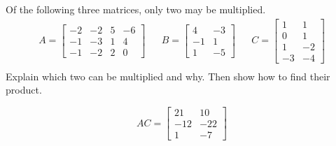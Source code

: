 
\begin{exerciseStatement}


Of the following three matrices, only two may be multiplied. 
\begin{align*} A= \left[\begin{array}{cccc}
-2 & -2 & 5 & -6 \\
-1 & -3 & 1 & 4 \\
-1 & -2 & 2 & 0
\end{array}\right]  & & B= \left[\begin{array}{cc}
4 & -3 \\
-1 & 1 \\
1 & -5
\end{array}\right]  & & C= \left[\begin{array}{cc}
1 & 1 \\
0 & 1 \\
1 & -2 \\
-3 & -4
\end{array}\right]  \\ \end{align*}
             Explain which two can be multiplied and why. Then show how to find their product.


\end{exerciseStatement}
    
\begin{exerciseAnswer} 
\[AC= \left[\begin{array}{cc}
21 & 10 \\
-12 & -22 \\
1 & -7
\end{array}\right] \]
\end{exerciseAnswer}
    
